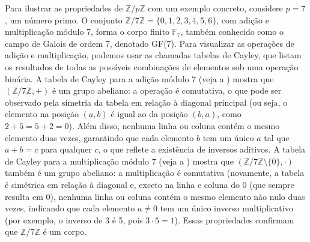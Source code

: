 \begin{example}
Para ilustrar as propriedades de $\mathbb{Z}/p\mathbb{Z}$ com um exemplo
concreto, considere $p = 7$, um número primo. O conjunto
$\mathbb{Z}/7\mathbb{Z} = \{0, 1, 2, 3, 4, 5, 6\}$, com adição e multiplicação
módulo 7, forma o corpo finito $\mathbb{F}_7$, também conhecido como o campo de
Galois de ordem 7, denotado GF(7). Para visualizar as operações de adição e
multiplicação, podemos usar as chamadas tabelas de Cayley, que listam os resultados
de todas as possíveis combinações de elementos sob uma operação binária.
A tabela de Cayley para a adição módulo 7 (veja a ) mostra que $(\mathbb{Z}/7\mathbb{Z}, +)$
é um grupo abeliano: a operação é comutativa, o que pode ser observado pela simetria
da tabela em relação à diagonal principal (ou seja, o elemento na posição $(a, b)$
é igual ao da posição $(b, a)$, como $2 + 5 = 5 + 2 = 0$). Além disso, nenhuma
linha ou coluna contém o mesmo elemento duas vezes, garantindo que cada
elemento $b$ tem um único $a$ tal que $a + b = c$ para qualquer
$c$, o que reflete a existência de inversos aditivos. A tabela de Cayley
para a multiplicação módulo 7 (veja a ) mostra que $(\mathbb{Z}/7\mathbb{Z} \setminus \{0\}, \cdot)$
também é um grupo abeliano: a multiplicação é comutativa (novamente, a tabela é
simétrica em relação à diagonal e, exceto na linha e coluna do 0 (que sempre resulta em 0),
nenhuma linha ou coluna contém o mesmo elemento não nulo duas vezes,
indicando que cada elemento $a \neq 0$ tem um único inverso
multiplicativo (por exemplo, o inverso de 3 é 5, pois $3 \cdot 5 = 1$).
Essas propriedades confirmam que $\mathbb{Z}/7\mathbb{Z}$ é um corpo.


\end{example}
